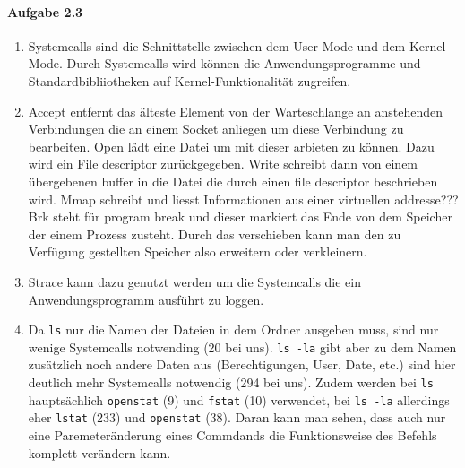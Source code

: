 \documentclass[11pt]{article}
\begin{document}
\paragraph{Aufgabe 2.3}
\begin{enumerate}[label = \alph*)]
\item Systemcalls sind die Schnittstelle zwischen dem User-Mode und dem Kernel-Mode. Durch Systemcalls wird können die Anwendungsprogramme und Standardbibliiotheken auf Kernel-Funktionalität zugreifen.

\item Accept entfernt das älteste Element von der Warteschlange an anstehenden Verbindungen die an einem Socket anliegen um diese Verbindung zu bearbeiten. Open lädt eine Datei um mit dieser arbieten zu können. Dazu wird ein File descriptor zurückgegeben. Write schreibt dann von einem übergebenen buffer in die Datei die durch einen file descriptor beschrieben wird. Mmap schreibt und liesst Informationen aus einer virtuellen addresse??? Brk steht für program break und dieser markiert das Ende von dem Speicher der einem Prozess zusteht. Durch das verschieben kann man den zu Verfügung gestellten Speicher also erweitern oder verkleinern.

\item Strace kann dazu genutzt werden um die Systemcalls die ein Anwendungsprogramm ausführt zu loggen.

\item Da \verb|ls| nur die Namen der Dateien in dem Ordner ausgeben muss, sind nur wenige Systemcalls notwending (20 bei uns). \verb|ls -la| gibt aber zu dem Namen zusätzlich noch andere Daten aus (Berechtigungen, User, Date, etc.) sind hier deutlich mehr Systemcalls notwendig (294 bei uns). Zudem werden bei \verb|ls| hauptsächlich \verb|openstat| (9) und \verb|fstat| (10) verwendet, bei \verb|ls -la| allerdings eher \verb|lstat| (233) und \verb|openstat| (38). Daran kann man sehen, dass auch nur eine Paremeteränderung eines Commdands die Funktionsweise des Befehls komplett verändern kann.
\end{enumerate}
\end{document}
